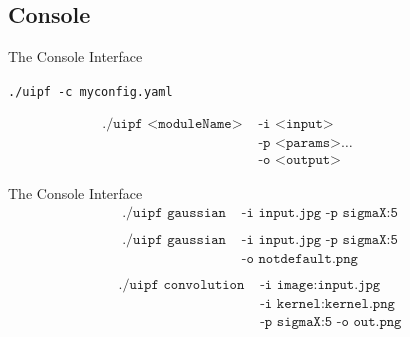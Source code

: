 \documentclass{beamer}
\begin{document}
\subsection{Console}
\begin{frame}{The Console Interface}
\Large
{}

	{\tt ./uipf -c myconfig.yaml}
\pause

	\vspace{.5cm}


	\begin{align*}
		\texttt{ ./uipf <moduleName>} & \texttt{ -i <input> } \qquad \qquad \qquad \\
									  & \texttt{ -p <params>} \dots \\
									  & \texttt{ -o <output>}
	\end{align*}


\end{frame}

\begin{frame}{The Console Interface}
\Large
	\begin{align*}
		\texttt{./uipf gaussian} & \texttt{ -i input.jpg -p sigmaX:5} \\
	\end{align*}
	\vspace{-1.5cm}\pause
	\begin{align*}
		\texttt{./uipf gaussian} & \texttt{ -i input.jpg -p sigmaX:5} \\
								 & \texttt{ -o notdefault.png}\\
	\end{align*}
	\vspace{-1.5cm}\pause
	\begin{align*}
		\texttt{./uipf convolution} & \texttt{ -i image:input.jpg} \\
									& \texttt{ -i kernel:kernel.png} \\
									& \texttt{ -p sigmaX:5 -o out.png}
	\end{align*}

\end{frame}


\end{document}
